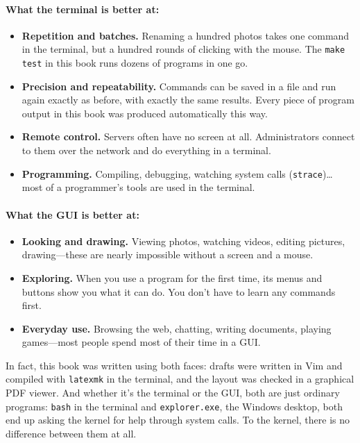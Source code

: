 \paragraph{What the terminal is better at:}
\begin{itemize}
  \item \textbf{Repetition and batches.} Renaming a hundred photos takes one command in the terminal, but a hundred rounds of clicking with the mouse. The \texttt{make test} in this book runs dozens of programs in one go.
  \item \textbf{Precision and repeatability.} Commands can be saved in a file and run again exactly as before, with exactly the same results. Every piece of program output in this book was produced automatically this way.
  \item \textbf{Remote control.} Servers often have no screen at all. Administrators connect to them over the network and do everything in a terminal.
  \item \textbf{Programming.} Compiling, debugging, watching system calls (\texttt{strace})\ldots{} most of a programmer's tools are used in the terminal.
\end{itemize}

\paragraph{What the GUI is better at:}
\begin{itemize}
  \item \textbf{Looking and drawing.} Viewing photos, watching videos, editing pictures, drawing---these are nearly impossible without a screen and a mouse.
  \item \textbf{Exploring.} When you use a program for the first time, its menus and buttons show you what it can do. You don't have to learn any commands first.
  \item \textbf{Everyday use.} Browsing the web, chatting, writing documents, playing games---most people spend most of their time in a GUI.
\end{itemize}

In fact, this book was written using both faces: drafts were written in Vim and compiled with \texttt{latexmk} in the terminal, and the layout was checked in a graphical PDF viewer. And whether it's the terminal or the GUI, both are just ordinary programs: \texttt{bash} in the terminal and \texttt{explorer.exe}, the Windows desktop, both end up asking the kernel for help through system calls. To the kernel, there is no difference between them at all.

